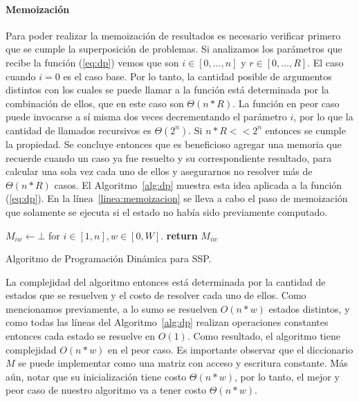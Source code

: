 \documentclass[10pt,a4paper]{article}
\begin{document}
\paragraph{Memoización}
Para poder realizar la memoización de resultados es necesario verificar primero que se cumple la superposición de problemas. Si analizamos los parámetros que recibe la función (\ref{eq:dp}) vemos que son $i \in [0, \hdots, n]$ y $r \in [0, \hdots, R]$. El caso cuando $i = 0$ es el caso base. Por lo tanto, la cantidad posible de argumentos distintos con los cuales se puede llamar a la función está determinada por la combinación de ellos, que en este caso son $\Theta(n * R)$. La función en peor caso puede invocarse a sí misma dos veces decrementando el parámetro $i$, por lo que la cantidad de llamados recursivos es $\Theta(2^n)$. Si $n*R << 2^n$ entonces se cumple la propiedad. 
Se concluye entonces que es beneficioso agregar una memoria que recuerde cuando un caso ya fue resuelto y su correspondiente resultado, para calcular una sola vez cada uno de ellos y asegurarnos no resolver más de $\Theta(n * R)$ casos. El Algoritmo~\ref{alg:dp} muestra esta idea aplicada a la función (\ref{eq:dp}). En la línea~\ref{linea:memoizacion} se lleva a cabo el paso de memoización que solamente se ejecuta si el estado no había sido previamente computado.

\begin{algorithm}
\begin{algorithmic}[1]
\State $M_{iw} \gets \bot$ for $i \in [1, n], w \in [0, W]$.
     \label{linea:memoizacion}
    \State \textbf{return} $M_{iw}$
\EndFunction
\end{algorithmic}
\caption{Algoritmo de Programación Dinámica para SSP.}
\label{alg:dp}
\end{algorithm}

La complejidad del algoritmo entonces está determinada por la cantidad de estados que se resuelven y el costo de resolver cada uno de ellos. Como mencionamos previamente, a lo sumo se resuelven $O(n * w)$ estados distintos, y como todas las líneas del Algoritmo~\ref{alg:dp} realizan operaciones constantes entonces cada estado se resuelve en $O(1)$. Como resultado, el algoritmo tiene complejidad $O(n*w)$ en el peor caso. Es importante observar que el diccionario $M$ se puede implementar como una matriz con acceso y escritura constante. Más aún, notar que su inicialización tiene costo $\Theta(n*w)$, por lo tanto, el mejor y peor caso de nuestro algoritmo va a tener costo $\Theta(n*w)$.
\end{document}
